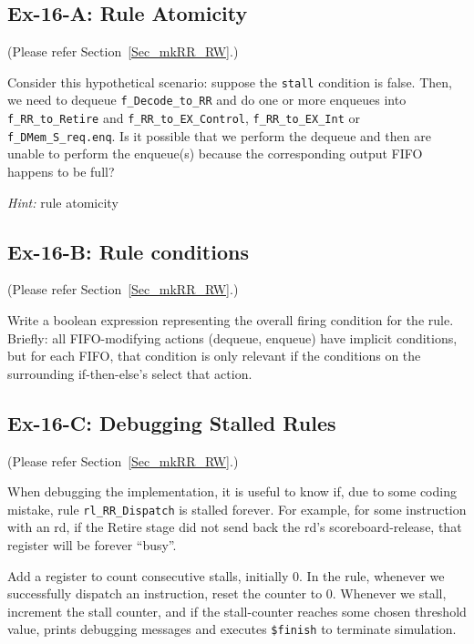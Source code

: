 
\subsection*{Ex-16-A: Rule Atomicity}
\label{Ex-16-A-Register-Read-and-Dispatch}

(Please refer Section~\ref{Sec_mkRR_RW}.)

Consider this hypothetical scenario: suppose the \verb|stall|
condition is false.  Then, we need to dequeue \verb|f_Decode_to_RR|
and do one or more enqueues into \verb|f_RR_to_Retire| and
\verb|f_RR_to_EX_Control|, \verb|f_RR_to_EX_Int| or
\verb|f_DMem_S_req.enq|.  Is it possible that we perform the dequeue
and then are unable to perform the enqueue(s) because the
corresponding output FIFO happens to be full?

\emph{Hint:} rule atomicity


\subsection*{Ex-16-B: Rule conditions}
\label{Ex-16-B-Rule-Conditions}

(Please refer Section~\ref{Sec_mkRR_RW}.)

Write a boolean expression representing the overall firing condition
for the rule.  Briefly: all FIFO-modifying actions (dequeue, enqueue)
have implicit conditions, but for each FIFO, that condition is only
relevant if the conditions on the surrounding if-then-else's select
that action.


\subsection*{Ex-16-C: Debugging Stalled Rules}
\label{Ex-16-C-Debugging-Stalled-Rules}

(Please refer Section~\ref{Sec_mkRR_RW}.)

When debugging the implementation, it is useful to know if, due to
some coding mistake, rule \verb|rl_RR_Dispatch| is stalled forever.
For example, for some instruction with an rd, if the Retire stage did
not send back the rd's scoreboard-release, that register will be
forever ``busy''.

Add a register to count consecutive stalls, initially 0.  In the rule,
whenever we successfully dispatch an instruction, reset the counter to
0.  Whenever we stall, increment the stall counter, and if the
stall-counter reaches some chosen threshold value, prints debugging
messages and executes \verb|$finish| to terminate simulation.

